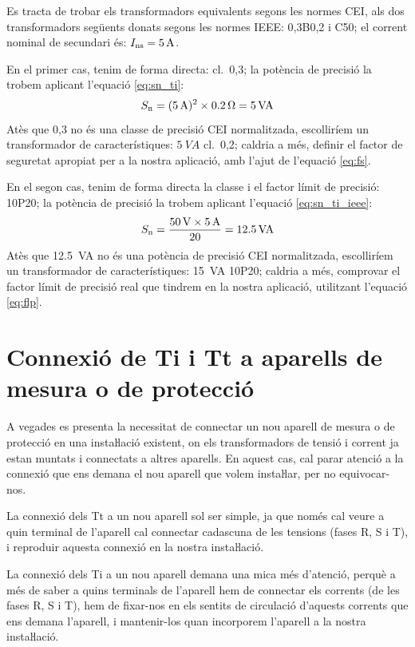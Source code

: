 \begin{exemple}[\TrafoIeeeEqCei{}]
	\addcontentsxms{\TrafoIeeeEqCei}
    Es tracta de trobar els transformadors equivalents segons les normes CEI, als dos
    transformadors següents donats segons les normes IEEE: 0,3B0,2 i
    C50; el corrent nominal de secundari és:    $I_\mathrm{ns}=\qty{5}{A}$.

    En el primer cas, tenim de forma directa: cl.~0,3; la potència de precisió la trobem
    aplicant l'equació \eqref{eq:sn_ti}:
    \[
        S_\mathrm{n} =(\qty{5}{A})^2 \times \qty{0,2}{\ohm} =  \qty{5}{VA}
    \]
    Atès que 0,3 no és una classe de precisió CEI normalitzada,
    escolliríem un transformador de característiques: $\qty{5}{VA}$ cl.~0,2; caldria a més, definir el factor de
    seguretat apropiat per a la nostra aplicació, amb l'ajut de l'equació \eqref{eq:fs}.

    En el segon cas, tenim de forma directa la classe i el factor límit de
    precisió: 10P20; la potència de precisió la trobem
    aplicant l'equació \eqref{eq:sn_ti_ieee}:
    \[
        S_\mathrm{n} = \frac{\qty{50}{V} \times\qty{5}{A}}{20} = \qty{12,5}{VA}
    \]
    Atès que \SI{12,5}{VA} no és una potència de precisió CEI normalitzada,
     escolliríem un transformador de característiques:
    \SI{15}{VA} 10P20; caldria a més, comprovar el factor límit de precisió real
    que tindrem en la nostra aplicació, utilitzant l'equació \eqref{eq:flp}.
\end{exemple}

\section{Connexió de Ti i Tt a aparells de mesura o de
protecció}\label{sec:conex_ti_tt}

A vegades es presenta la necessitat de connectar un nou aparell de
mesura o de protecció en una instaŀlació existent, on els
transformadors de tensió i corrent ja estan muntats i connectats a
altres aparells. En aquest cas, cal parar atenció a la connexió
que ens demana el nou aparell que volem instaŀlar, per  no
equivocar-nos.

La connexió dels Tt a un nou aparell sol ser simple, ja que només
cal veure a quin terminal de l'aparell cal connectar cadascuna de
les tensions (fases R, S i T), i reproduir aquesta connexió en la
nostra instaŀlació.

La connexió dels Ti a un nou aparell demana una mica més
d'atenció, perquè a més de saber a  quins terminals de l'aparell hem
de connectar els corrents (de les fases R, S i T), hem de fixar-nos
en els sentits de circulació d'aquests corrents que ens demana
l'aparell, i mantenir-los quan incorporem l'aparell a la nostra
instaŀlació.

